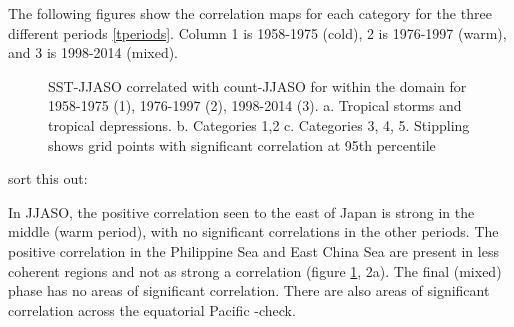 The following figures show the correlation maps for each category for the three different periods \ref{tperiods}. Column 1 is 1958-1975 (cold), 2 is 1976-1997 (warm), and 3 is 1998-2014 (mixed). 


\begin{figure}
	\centering
	
	
	
	\caption{SST-JJASO correlated with count-JJASO for within the domain for 1958-1975 (1), 1976-1997 (2), 1998-2014 (3). a. Tropical storms and tropical depressions. b. Categories 1,2 c. Categories 3, 4, 5.  Stippling shows grid points with significant correlation at 95th percentile} \label{fig:corr_JJASO_periods} 
\end{figure} 

sort this out:

In JJASO, the positive correlation seen to the east of Japan is strong in the middle (warm period), with no significant correlations in the other periods. The positive correlation in the Philippine Sea and East China Sea are present in less coherent regions and not as strong a correlation (figure \ref{fig:corr_JJASO_periods}, 2a). The final (mixed) phase has no areas of significant correlation. 
 There are also areas of significant correlation across the equatorial Pacific  -check.

